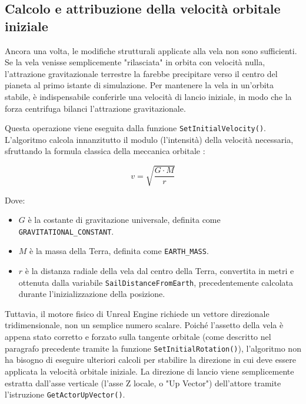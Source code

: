 
\subsection{Calcolo e attribuzione della velocità orbitale iniziale}

Ancora una volta, le modifiche strutturali applicate alla vela non sono sufficienti. Se la vela venisse semplicemente "rilasciata" in orbita con velocità nulla, l'attrazione gravitazionale terrestre la farebbe precipitare verso il centro del pianeta al primo istante di simulazione. Per mantenere la vela in un'orbita stabile, è indispensabile conferirle una velocità di lancio iniziale, in modo che la forza centrifuga bilanci l'attrazione gravitazionale.

Questa operazione viene eseguita dalla funzione \lstinline|SetInitialVelocity()|. L'algoritmo calcola innanzitutto il modulo (l'intensità) della velocità necessaria, sfruttando la formula classica della meccanica orbitale \cite{curtis2005orbital}:

\begin{equation}
    v = \sqrt{\frac{G \cdot M}{r}}
\end{equation}

Dove:
\begin{itemize}
    \item $G$ è la costante di gravitazione universale, definita come \lstinline|GRAVITATIONAL_CONSTANT|.
    \item $M$ è la massa della Terra, definita come \lstinline|EARTH_MASS|.
    \item $r$ è la distanza radiale della vela dal centro della Terra, convertita in metri e ottenuta dalla variabile \lstinline|SailDistanceFromEarth|, precedentemente calcolata durante l'inizializzazione della posizione.
\end{itemize}

Tuttavia, il motore fisico di Unreal Engine richiede un vettore direzionale tridimensionale, non un semplice numero scalare. Poiché l'assetto della vela è appena stato corretto e forzato sulla tangente orbitale (come descritto nel paragrafo precedente tramite la funzione \lstinline|SetInitialRotation()|), l'algoritmo non ha bisogno di eseguire ulteriori calcoli per stabilire la direzione in cui deve essere applicata la velocità orbitale iniziale. La direzione di lancio viene semplicemente estratta dall'asse verticale (l'asse Z locale, o "Up Vector") dell'attore tramite l'istruzione \lstinline|GetActorUpVector()|. 

